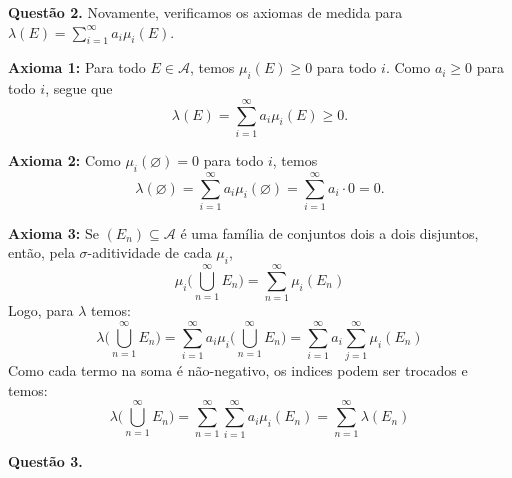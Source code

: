 \documentclass[12pt, a4paper]{article}
\newenvironment{solution}[1]{\par\vspace{1.2em}\noindent\textbf{Questão #1.}}{\par\vspace{0.5em}}
\begin{document}
\begin{solution}{2}
    Novamente, verificamos os axiomas de medida para $\lambda(E) = \sum_{i=1}^{\infty}a_i \mu_i(E)$.

    \textbf{Axioma 1:} Para todo $E\in\mathcal{A}$, temos $\mu_i(E)\geq 0$ para todo $i$. Como $a_i\geq 0$ para todo $i$, segue que
    \[
        \lambda(E)=\sum_{i=1}^{\infty} a_i \mu_i(E) \geq 0.
    \]

    \textbf{Axioma 2:} Como $\mu_i(\varnothing)=0$ para todo $i$, temos
    \[
        \lambda(\varnothing) = \sum_{i=1}^{\infty} a_i \mu_i(\varnothing) = \sum_{i=1}^{\infty} a_i \cdot 0 = 0.
    \]

    \textbf{Axioma 3:} Se $(E_n)\subseteq\mathcal{A}$ é uma família de conjuntos dois a dois disjuntos, então, pela $\sigma$-aditividade de cada $\mu_i$,
    \[
        \mu_i\biggl(\bigcup_{n=1}^{\infty} E_n\biggr) = \sum_{n=1}^{\infty} \mu_i(E_n)
    \]
    Logo, para $\lambda$ temos:
    \[
        \lambda\biggl(\bigcup_{n=1}^{\infty} E_n\biggr) = \sum_{i=1}^{\infty}a_i\mu_i \biggl(\bigcup_{n=1}^{\infty} E_n\biggr) = \sum_{i=1}^{\infty}a_i \sum_{j=1}^{\infty}\mu_i(E_n)
    \]
    Como cada termo na soma é não-negativo, os indices podem ser trocados e temos:
    \[
        \lambda\biggl(\bigcup_{n=1}^{\infty}E_n\biggr) = \sum_{n=1}^{\infty}\sum_{i=1}^{\infty}a_i\mu_i(E_n) = \sum_{n=1}^{\infty}\lambda(E_n)
    \] 

\end{solution}

\begin{solution}{3}

\end{solution}
\end{document}
